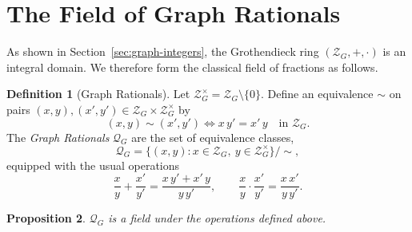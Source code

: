 \documentclass[11pt]{article}
\theoremstyle{definition}
\newtheorem{definition}{Definition}[section]
\theoremstyle{plain}
\newtheorem{proposition}[definition]{Proposition}
\theoremstyle{remark}
\begin{document}
\section{The Field of Graph Rationals}
\label{sec:graph-rationals}

As shown in Section~\ref{sec:graph-integers}, the Grothendieck ring
$(\mathcal{Z}_G,+,\cdot)$ is an integral domain.  We therefore form
the classical field of fractions as follows.

\begin{definition}[Graph Rationals]
Let
$\mathcal{Z}_G^{\times}=\mathcal{Z}_G\setminus\{0\}$.  Define an
equivalence \(\sim\) on pairs
\((x,y),(x',y')\in\mathcal{Z}_G\times\mathcal{Z}_G^{\times}\) by
\[
  (x,y)\sim(x',y') \iff x\,y'=x'\,y
  \quad\text{in }\mathcal{Z}_G.
\]
The \emph{Graph Rationals}
\(\mathcal{Q}_G\) are the set of equivalence classes,
\[
  \mathcal{Q}_G
  =\bigl\{(x,y):x\in\mathcal{Z}_G,\ y\in\mathcal{Z}_G^{\times}\bigr\}/\sim,
\]
equipped with the usual operations
\[
  \frac{x}{y}+\frac{x'}{y'}
  =\frac{x\,y'+x'\,y}{y\,y'},
  \qquad
  \frac{x}{y}\cdot\frac{x'}{y'}
  =\frac{x\,x'}{y\,y'}.
\]
\end{definition}

\begin{proposition}
$\mathcal{Q}_G$ is a field under the operations defined above.
\end{proposition}
\end{document}
